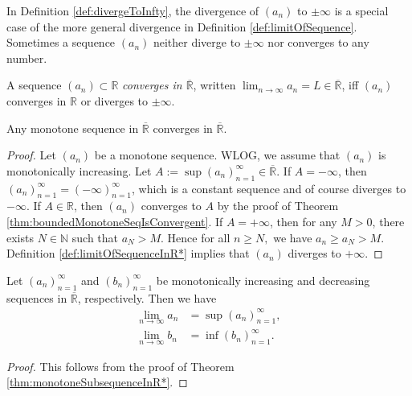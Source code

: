 \begin{rem}
  In Definition \ref{def:divergeToInfty},
  the divergence of $(a_n)$ to $\pm \infty$
  is a special case of the more general divergence
  in Definition \ref{def:limitOfSequence}. 
  Sometimes a sequence $(a_n)$ neither diverge to $\pm \infty$
  nor converges to any number.  
\end{rem}

\begin{defn}
  \label{def:limitOfSequenceInRclosure}
  A sequence $(a_n)\subset \mathbb{R}$
  \emph{converges in $\overline{\mathbb{R}}$},
  written $\lim_{n\rightarrow \infty} a_n = L\in \overline{\mathbb{R}}$,
  iff $(a_{n})$ converges in $\mathbb{R}$ or
  diverges to $\pm \infty$. 
\end{defn}

\begin{thm}
  \label{thm:monotoneSubsequenceInR*}
  Any monotone sequence in $\overline{\mathbb{R}}$ converges in $\overline{\mathbb{R}}$.
\end{thm}
\begin{proof}
  Let $(a_{n})$ be a monotone sequence.
  WLOG, we assume that $(a_{n})$ is monotonically increasing.
  Let $A:=\sup(a_{n})_{n=1}^{\infty}\in \overline{\mathbb{R}}. $
  If $A=-\infty$, then $(a_{n})_{n=1}^{\infty}=(-\infty)_{n=1}^{\infty}$,
  which is a constant sequence and of course diverges to $-\infty$.
  If $A\in \mathbb{R}$, then $(a_{n})$ converges to $A$ by the proof of
  Theorem \ref{thm:boundedMonotoneSeqIsConvergent}.
  If $A=+\infty$, then for any $M>0$,
  there exists $N\in \mathbb{N}$ such that $a_{N}>M$.
  Hence for all $n\ge N,$ we have $a_{n}\ge a_{N}>M$.
  Definition \ref{def:limitOfSequenceInR*} implies
  that $(a_{n})$ diverges to $+\infty$.
\end{proof}

\begin{coro}
  \label{coro:theEquivalenceOfMonotoneSequenceLimit}
  Let $(a_{n})_{n=1}^{\infty}$ and $(b_{n})_{n=1}^{\infty}$
  be monotonically increasing and decreasing
  sequences in $\overline{\mathbb{R}}$, respectively. Then we have
  \begin{align}
    \lim_{n\rightarrow \infty}a_{n}&=\sup(a_{n})_{n=1}^{\infty},
    \label{eq:monotonicallyIncreasingLimit}
    \\
    \lim_{n\rightarrow \infty}b_{n}&=\inf(b_{n})_{n=1}^{\infty}.
    \label{eq:monotonicallyDecreasingLimit}
  \end{align}
\end{coro}
\begin{proof}
  This follows from the proof of
  Theorem \ref{thm:monotoneSubsequenceInR*}.
\end{proof}

